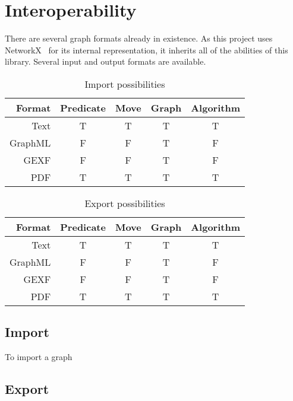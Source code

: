\section{Interoperability}
\label{sec:iface-interoperability}
There are several graph formats already in existence.
As this project uses NetworkX~\autocite{hagberg:networkx} for its internal representation,
  it inherits all of the abilities of this library.
Several input and output formats are available.
\begin{table}
  \centering
  \providecommand\yes{T}
  \providecommand\no{F}
  \begin{tabular}{rcccc}
    \toprule
    Format  & Predicate & Move & Graph & Algorithm \\
    \midrule
    Text    & \yes      & \yes & \yes  & \yes      \\
    GraphML & \no       & \no  & \yes  & \no       \\
    GEXF    & \no       & \no  & \yes  & \no       \\
    PDF     & \yes      & \yes & \yes  & \yes      \\
    \bottomrule
  \end{tabular}
  \caption{Import possibilities}
  \label{tab:interop:import}
\end{table}
\begin{table}
  \centering
  \providecommand\yes{T}
  \providecommand\no{F}
  \begin{tabular}{rcccc}
    \toprule
    Format  & Predicate & Move & Graph & Algorithm \\
    \midrule
    Text    & \yes      & \yes & \yes  & \yes      \\
    GraphML & \no       & \no  & \yes  & \no       \\
    GEXF    & \no       & \no  & \yes  & \no       \\
    PDF     & \yes      & \yes & \yes  & \yes      \\
    \bottomrule
  \end{tabular}
  \caption{Export possibilities}
  \label{tab:interop:export}
\end{table}


\subsection{Import}
\label{sec:interop:import}

To import a graph

\subsection{Export}
\label{sec:interop:export}



